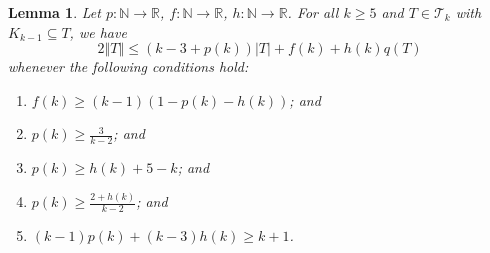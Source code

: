 \documentclass[12pt]{article}
\theoremstyle{plain}
\newtheorem{lem}[thm]{Lemma}
\theoremstyle{definition}
\theoremstyle{remark}
\newcommand{\fancy}[1]{\mathcal{#1}}
\newcommand{\IN}{\mathbb{N}}
\newcommand{\IR}{\mathbb{R}}
\newcommand{\T}{\fancy{T}}
\newcommand{\card}[1]{\left|#1\right|}
\newcommand{\size}[1]{\left\Vert#1\right\Vert}
\newcommand{\func}[3]{#1\colon #2 \rightarrow #3}
\begin{document}
\begin{lem}\label{BoundFamilyWithKKMinusOne}
	Let $\func{p}{\IN}{\IR}$, $\func{f}{\IN}{\IR}$, $\func{h}{\IN}{\IR}$. 
	For all $k \ge 5$ and $T \in \T_k$ with $K_{k-1} \subseteq T$, we have
	\[2\size{T} \le (k-3 + p(k))\card{T} + f(k) + h(k)q(T)\]
	whenever the following conditions hold:
	\begin{enumerate}
		\item $f(k) \ge (k-1)(1- p(k) - h(k))$; and	
	    \item $p(k) \ge \frac{3}{k-2}$; and
		\item $p(k) \ge h(k) + 5 - k$; and
		\item $p(k) \ge \frac{2+h(k)}{k-2}$; and
		\item $(k-1)p(k) + (k-3)h(k) \ge k+1$.
	\end{enumerate}
	
\end{lem}
\end{document}
